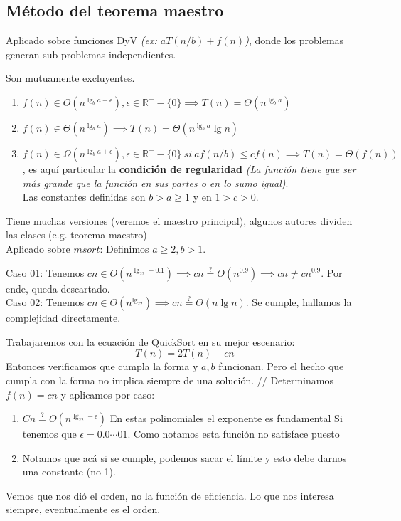 \documentclass[tikz,11pt,fleqn]{book} %
\begin{document}
\subsection{Método del teorema maestro}
Aplicado sobre funciones DyV \textit{(ex: $aT(n/b)+f(n)$)}, donde los problemas generan sub-problemas independientes.
\begin{theorem}[Casos]
    Son mutuamente excluyentes.
    \begin{enumerate}
        \item $f(n)\in O(n^{\lg_b{a-\epsilon}}),
        \epsilon\in\mathbb{R}^{+}-\{0\}
        \implies T(n)=\Theta(n^{\lg_ba})$
        \item $f(n)\in \Theta(n^{\lg_ba})
        \implies T(n)=\Theta(n^{\lg_ba}\lg n)$
        \item $f(n)\in \Omega(n^{\lg_b{a+\epsilon}}),
        \epsilon\in\mathbb{R}^{+}-\{0\}~si~af(n/b)\le cf(n)
        \implies T(n)=\Theta(f(n))$, es aquí particular la \textbf{condición de regularidad} \textit{(La función tiene que ser más grande que la función en sus partes o en lo sumo igual)}.\\
        Las constantes definidas son $b>a\ge1$ y en $1>c>0$.
    \end{enumerate}
\end{theorem}

\begin{example}
    Tiene muchas versiones (veremos el maestro principal), algunos autores dividen las clases (e.g. teorema maestro)
    \\
    Aplicado sobre $msort$:
    Definimos $a\ge2, b>1$.

    
    Caso 01: Tenemos $cn\in O(n^{\lg_22-0.1})\implies cn \stackrel?= O(n^{0.9})
    \implies cn\ne cn^{0.9}$. Por ende, queda descartado.\\
    Caso 02: Tenemos $cn\in \Theta(n^{\lg_22})\implies cn \stackrel?= \Theta(n\lg n)$. Se cumple, hallamos la complejidad directamente.
\end{example}

\begin{example}
Trabajaremos con la ecuación de QuickSort en su mejor escenario:
$$ T(n)=2T(n)+cn $$
Entonces verificamos que cumpla la forma y $a, b$ funcionan. Pero el hecho que cumpla con la forma no implica siempre de una solución.
//
Determinamos $f(n)=cn$ y aplicamos por caso:
\begin{enumerate}
    \item $Cn\stackrel?=O(n^{\lg_22-\epsilon})$
En estas polinomiales el exponente es fundamental
    Si tenemos que $\epsilon=0.0\cdots01$. Como notamos esta función no satisface puesto 

    \item Notamos que acá si se cumple, podemos sacar el límite y esto debe darnos una constante (no 1).
\end{enumerate}
Vemos que nos dió el orden, no la función de eficiencia. Lo que nos interesa siempre, eventualmente es el orden.

\end{example}
\end{document}
